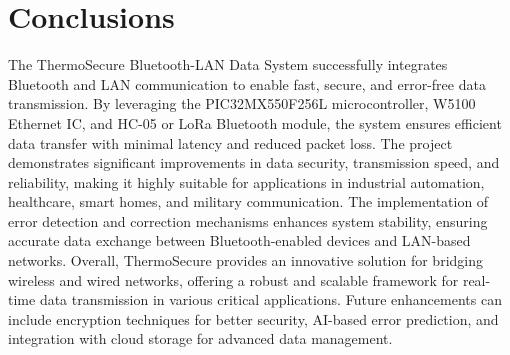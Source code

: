 \documentclass[12pt]{report}
\begin{document}
\section{Conclusions}
The ThermoSecure Bluetooth-LAN Data System successfully integrates Bluetooth and LAN communication to enable fast, secure, and error-free data transmission. By leveraging the PIC32MX550F256L microcontroller, W5100 Ethernet IC, and HC-05 or LoRa Bluetooth module, the system ensures efficient data transfer with minimal latency and reduced packet loss. The project demonstrates significant improvements in data security, transmission speed, and reliability, making it highly suitable for applications in industrial automation, healthcare, smart homes, and military communication. The implementation of error detection and correction mechanisms enhances system stability, ensuring accurate data exchange between Bluetooth-enabled devices and LAN-based networks. Overall, ThermoSecure provides an innovative solution for bridging wireless and wired networks, offering a robust and scalable framework for real-time data transmission in various critical applications. Future enhancements can include encryption techniques for better security, AI-based error prediction, and integration with cloud storage for advanced data management.
\end{document}
